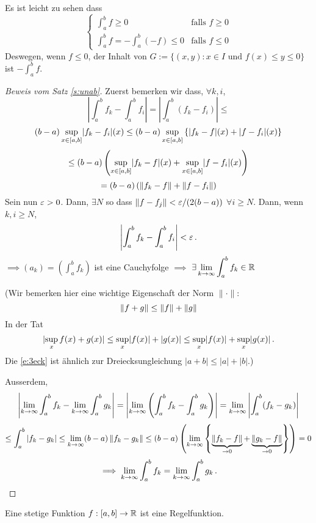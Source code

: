 \begin{Bem} Es ist leicht zu sehen dass
  \[ \begin{cases}
    \int_a^bf\geq 0&  \mbox{falls }f\geq 0\\
    \int_a^bf = -\int_a^b (-f) \leq 0& \mbox{falls } f\leq 0
  \end{cases}\]
Deswegen, wenn $f\leq 0$, der Inhalt von $G:=\{(x,y): x\in I \mbox{ und } f(x) \leq y \leq 0\}$
ist $- \int_a^b f$.
\end{Bem}
\begin{proof}[Beweis vom Satz \ref{s:unab}] Zuerst bemerken wir dass, $\forall k, i$,
\[\left|\int_a^bf_k-\int_a^bf_i\right|=\left|\int_a^b(f_k-f_i)\right|\leq\]
\[(b-a) \sup_{x\in[a,b]}\mathopen| f_k-f_i \mathclose|(x)\leq (b-a) 
\sup_{x\in[a,b]}\left\{ \mathopen| f_k-f \mathclose|(x)+\mathopen| f-f_i \mathclose|(x) \right\}\]
  \[\leq (b-a) \left(\sup_{x\in[a,b]}\mathopen| f_k-f \mathclose|(x)+\sup_{x\in[a,b]}\mathopen| f-f_i \mathclose|(x)\right)\]
  \[=(b-a) \left(\left\| f_k-f \right\|+\left\| f-f_i \right\|\right) \]
Sein nun $\varepsilon>0$. Dann, $\exists N$ so dass $\|f-f_j\| < \varepsilon/(2(b-a))$ $\forall i\geq N$.
Dann, wenn $k,i\geq N$,
\[
\left|\int_a^bf_k-\int_a^bf_i\right| < \varepsilon\, .
\]
$\implies (a_k)=\left( \int_a^bf_k \right)$ ist eine Cauchyfolge 
$\implies$ $\exists \displaystyle\lim_{k\rightarrow\infty}\int_a^bf_k\in\mathbb{R}$

\medskip

(Wir bemerken hier eine wichtige Eigenschaft der Norm $\|\cdot\|$:
\begin{equation}\label{e:3eck}
\left\| f+g \right\|\leq \left\| f \right\|+\left\| g \right\|
\end{equation}
In der Tat 
\[\mathopen| \sup_xf(x)+g(x) \mathclose|\leq \sup_x\mathopen| f(x) \mathclose|+\mathopen| g(x) \mathclose|\leq\sup_x\mathopen| f(x) \mathclose|+\sup_x\mathopen| g(x) \mathclose|\, .\]
Die \eqref{e:3eck} ist \"ahnlich zur Dreiecksungleichung $|a+b|\leq |a|+|b|$.)

\medskip

Ausserdem,
\[\left|\displaystyle\lim_{k\rightarrow\infty}\int_a^bf_k-\displaystyle\lim_{k\rightarrow\infty}\int_a^bg_k\right|
=\left|\displaystyle\lim_{k\rightarrow\infty}\left( \int_a^bf_k-\int_a^bg_k \right)\right|
=\displaystyle\lim_{k\rightarrow\infty}\left|\int_a^b(f_k-g_k)\right|\]
\[\leq \int_a^b |f_k-g_k| \leq\displaystyle\lim_{k\rightarrow\infty} (b-a) \left\| f_k-g_k \right\|
\leq (b-a) \left(\displaystyle\lim_{k\rightarrow\infty}\left\{ \underbrace{\left\| f_k-f \right\|}_{\to 0}+\underbrace{\left\| g_k-f \right\|}_{\to 0} \right\}\right)=0\]
  \[\implies \displaystyle\lim_{k\rightarrow\infty}\int_a^bf_k=\displaystyle\lim_{k\rightarrow\infty}\int_a^bg_k\, .\]
\end{proof}
\begin{Sat}
  Eine stetige Funktion $f:[a,b]\to\mathbb{R}$ ist eine Regelfunktion.
\end{Sat}

